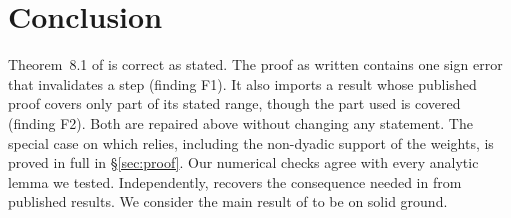 \documentclass[11pt]{amsart}
\theoremstyle{remark}
\theoremstyle{definition}
\numberwithin{equation}{section}
\begin{document}
\section{Conclusion}
Theorem~8.1 of \cite{GM1} is correct as stated. The proof as written contains one sign error that invalidates a step (finding F1). It also imports a result whose published proof covers only part of its stated range, though the part used is covered (finding F2). Both are repaired above without changing any statement. The special case on which \cite{II} relies, including the non-dyadic support of the weights, is proved in full in \S\ref{sec:proof}. Our numerical checks agree with every analytic lemma we tested. Independently, \cite{KUZ} recovers the consequence needed in \cite{II} from published results. We consider the main result of \cite{II} to be on solid ground.

\appendix
\end{document}
